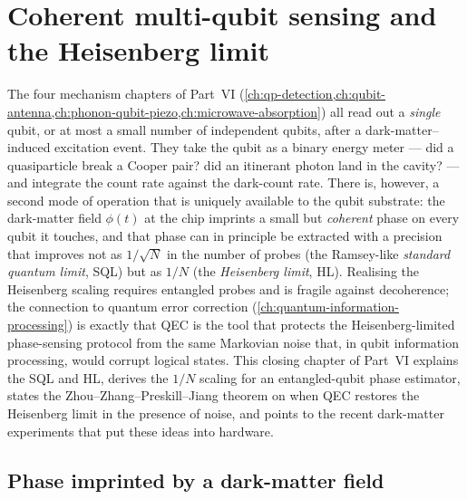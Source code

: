 \chapter{Coherent multi-qubit sensing and the Heisenberg limit}
\label{ch:coherent-multiqubit}

The four mechanism chapters of Part~VI
(\cref{ch:qp-detection,ch:qubit-antenna,ch:phonon-qubit-piezo,ch:microwave-absorption})
all read out a \emph{single} qubit, or at most a small number of
independent qubits, after a dark-matter--induced excitation
event. They take the qubit as a binary energy meter --- did a
quasiparticle break a Cooper pair? did an itinerant photon land
in the cavity? --- and integrate the count rate against the
dark-count rate. There is, however, a second mode of operation
that is uniquely available to the qubit substrate: the
dark-matter field $\phi(t)$ at the chip imprints a small but
\emph{coherent} phase on every qubit it touches, and that phase
can in principle be extracted with a precision that improves not
as $1/\sqrt{N}$ in the number of probes (the Ramsey-like
\emph{standard quantum limit}, SQL) but as $1/N$ (the
\emph{Heisenberg limit}, HL). Realising the Heisenberg
scaling requires entangled probes and is fragile against
decoherence; the connection to quantum error correction
(\cref{ch:quantum-information-processing}) is exactly that QEC
is the tool that protects the Heisenberg-limited phase-sensing
protocol from the same Markovian noise that, in qubit
information processing, would corrupt logical states. This
closing chapter of Part~VI explains the SQL and HL, derives the
$1/N$ scaling for an entangled-qubit phase estimator, states the
Zhou--Zhang--Preskill--Jiang theorem on when QEC restores
the Heisenberg limit in the presence of noise, and points to
the recent dark-matter experiments that put these ideas into
hardware.

\section{Phase imprinted by a dark-matter field}
\label{sec:dm-phase}

